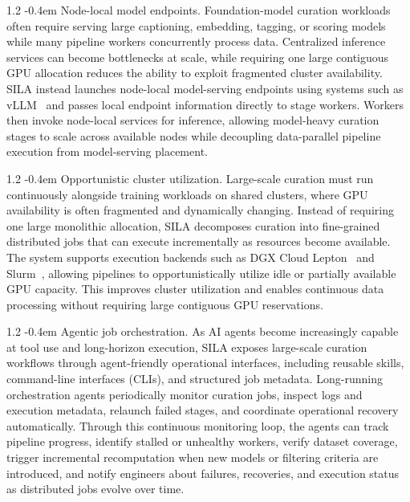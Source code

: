 \documentclass{llmxive}
\makeatletter
\providecommand{\paragraph}{  \@startsection{paragraph}{4}{\z@}    {1\baselineskip \@plus .2\baselineskip}    {-0.4em}    {\normalfont\normalsize\bfseries}}
\makeatother
\begin{document}
\paragraph{Node-local model endpoints.}
Foundation-model curation workloads often require serving large captioning, embedding, tagging, or scoring models while many pipeline workers concurrently process data. Centralized inference services can become bottlenecks at scale, while requiring one large contiguous GPU allocation reduces the ability to exploit fragmented cluster availability. SILA instead launches node-local model-serving endpoints using systems such as vLLM~\citep{vllm} and passes local endpoint information directly to stage workers. Workers then invoke node-local services for inference, allowing model-heavy curation stages to scale across available nodes while decoupling data-parallel pipeline execution from model-serving placement.

\paragraph{Opportunistic cluster utilization.}
Large-scale curation must run continuously alongside training workloads on shared clusters, where GPU availability is often fragmented and dynamically changing. Instead of requiring one large monolithic allocation, SILA decomposes curation into fine-grained distributed jobs that can execute incrementally as resources become available. The system supports execution backends such as DGX Cloud Lepton~\citep{nvidia2026dgxcloudlepton} and Slurm~\citep{jette2023slurmarchitecture}, allowing pipelines to opportunistically utilize idle or partially available GPU capacity. This improves cluster utilization and enables continuous data processing without requiring large contiguous GPU reservations.

\paragraph{Agentic job orchestration.}
As AI agents become increasingly capable at tool use and long-horizon execution, SILA exposes large-scale curation workflows through agent-friendly operational interfaces, including reusable skills, command-line interfaces (CLIs), and structured job metadata. Long-running orchestration agents periodically monitor curation jobs, inspect logs and execution metadata, relaunch failed stages, and coordinate operational recovery automatically. Through this continuous monitoring loop, the agents can track pipeline progress, identify stalled or unhealthy workers, verify dataset coverage, trigger incremental recomputation when new models or filtering criteria are introduced, and notify engineers about failures, recoveries, and execution status as distributed jobs evolve over time.
\end{document}

